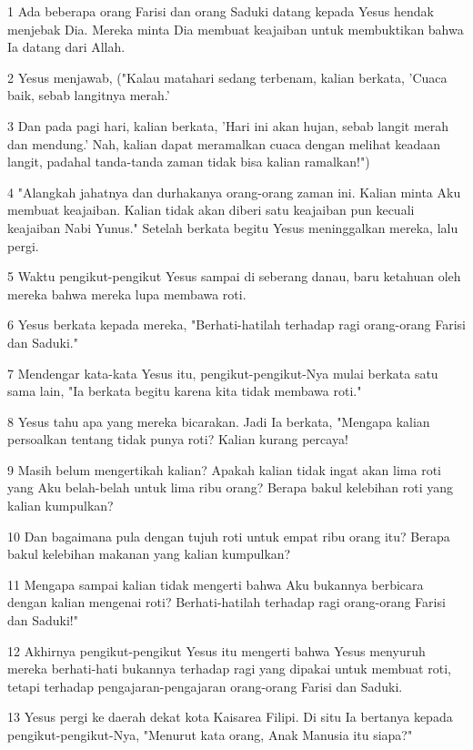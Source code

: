 \par 1 Ada beberapa orang Farisi dan orang Saduki datang kepada Yesus hendak menjebak Dia. Mereka minta Dia membuat keajaiban untuk membuktikan bahwa Ia datang dari Allah.
\par 2 Yesus menjawab, ("Kalau matahari sedang terbenam, kalian berkata, 'Cuaca baik, sebab langitnya merah.'
\par 3 Dan pada pagi hari, kalian berkata, 'Hari ini akan hujan, sebab langit merah dan mendung.' Nah, kalian dapat meramalkan cuaca dengan melihat keadaan langit, padahal tanda-tanda zaman tidak bisa kalian ramalkan!")
\par 4 "Alangkah jahatnya dan durhakanya orang-orang zaman ini. Kalian minta Aku membuat keajaiban. Kalian tidak akan diberi satu keajaiban pun kecuali keajaiban Nabi Yunus." Setelah berkata begitu Yesus meninggalkan mereka, lalu pergi.
\par 5 Waktu pengikut-pengikut Yesus sampai di seberang danau, baru ketahuan oleh mereka bahwa mereka lupa membawa roti.
\par 6 Yesus berkata kepada mereka, "Berhati-hatilah terhadap ragi orang-orang Farisi dan Saduki."
\par 7 Mendengar kata-kata Yesus itu, pengikut-pengikut-Nya mulai berkata satu sama lain, "Ia berkata begitu karena kita tidak membawa roti."
\par 8 Yesus tahu apa yang mereka bicarakan. Jadi Ia berkata, "Mengapa kalian persoalkan tentang tidak punya roti? Kalian kurang percaya!
\par 9 Masih belum mengertikah kalian? Apakah kalian tidak ingat akan lima roti yang Aku belah-belah untuk lima ribu orang? Berapa bakul kelebihan roti yang kalian kumpulkan?
\par 10 Dan bagaimana pula dengan tujuh roti untuk empat ribu orang itu? Berapa bakul kelebihan makanan yang kalian kumpulkan?
\par 11 Mengapa sampai kalian tidak mengerti bahwa Aku bukannya berbicara dengan kalian mengenai roti? Berhati-hatilah terhadap ragi orang-orang Farisi dan Saduki!"
\par 12 Akhirnya pengikut-pengikut Yesus itu mengerti bahwa Yesus menyuruh mereka berhati-hati bukannya terhadap ragi yang dipakai untuk membuat roti, tetapi terhadap pengajaran-pengajaran orang-orang Farisi dan Saduki.
\par 13 Yesus pergi ke daerah dekat kota Kaisarea Filipi. Di situ Ia bertanya kepada pengikut-pengikut-Nya, "Menurut kata orang, Anak Manusia itu siapa?"
